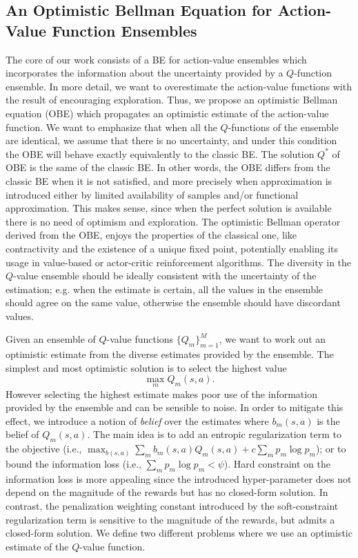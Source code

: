 \subsection{An Optimistic Bellman Equation for Action-Value Function Ensembles}
The core of our work consists of a BE for action-value ensembles which incorporates the information about the uncertainty provided by a $Q$-function ensemble.
In more detail, we want to overestimate the action-value functions with the result of encouraging exploration.   
Thus, we propose an optimistic Bellman equation (OBE) which propagates an optimistic estimate of the action-value function. 
We want to emphasize that when all the $Q$-functions of the ensemble are identical, we assume that there is no uncertainty, and under this condition the OBE will behave exactly equivalently to the classic BE. The solution $Q^*$ of OBE is the same of the classic BE. In other words, the OBE differs from the classic BE when it is not satisfied, and more precisely when approximation is introduced either by limited availability of samples and/or functional approximation. This makes sense, since when the perfect solution is available there is no need of optimism and exploration. 
The optimistic Bellman operator derived from the OBE, enjoys the properties of the classical one, like contractivity and the existence of a unique fixed point, potentially enabling its usage in value-based or actor-critic reinforcement algorithms. 
The diversity in the $Q$-value ensemble should be ideally consistent with the uncertainty of the estimation; e.g. when the estimate is certain, all the values in the ensemble should agree on the same value, otherwise the ensemble should have discordant values.        

Given an ensemble of $Q$-value functions $\{Q_m\}_{m=1}^M$, we want to work out an optimistic estimate from the diverse estimates provided by the ensemble. The simplest and most optimistic solution is to select the highest value 
\begin{equation}
\max_m Q_m(s,a).\nonumber
\end{equation} 
However selecting the highest estimate makes poor use of the information provided by the ensemble and can be sensible to noise. In order to mitigate this effect, we introduce a notion of \textsl{belief} over the estimates where $b_m(s,a)$ is the belief of $Q_m(s,a)$. The main idea is to add an entropic regularization term to the objective (i.e., $\max_{b(s,a)} \sum_m b_m(s,a) Q_m(s,a) + c \sum_{m} p_m \log p_m $); or to bound the information loss (i.e., $\sum_m p_m \log p_m < \psi$). Hard constraint on the information loss is more appealing since the introduced hyper-parameter does not depend on the magnitude of the rewards but has no closed-form solution. In contrast, the penalization weighting constant introduced by the soft-constraint regularization term is sensitive to the magnitude of the rewards, but admits a closed-form solution.
We define two different problems where we use an optimistic estimate of the $Q$-value function.

